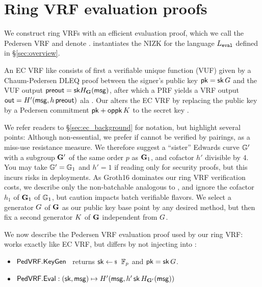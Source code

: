 \section{Ring VRF evaluation proofs} %
\label{sec:pederson_vrf}

We construct ring VRFs with an efficient evaluation proof, which
we call the Pedersen VRF and denote \PedVRF.
\PedVRF instantiates the NIZK for the language $L_{\mathtt{eval}}$ defined in \S\ref{sec:overview}.

An EC VRF like \cite{nsec5,VXEd25519,draft-irtf-cfrg-vrf-10} 
consists of first a verifiable unique function (VUF) given by a
Chaum-Pedersen DLEQ proof between the signer's public key $\mathsf{pk} = \mathsf{sk} \, G$ and
 the VUF output ${\mathsf{preout}} = \mathsf{sk} H_{{\mathbf{G}}}(\mathsf{msg})$,
after which a PRF  yields a VRF output
 ${\mathsf{out}} = H'(\mathsf{msg}, h \, {\mathsf{preout}})$ ala \cite[Proposition 1]{vrf_micali}.
%
Our \PedVRF alters the EC VRF by replacing the public key by
a Pedersen commitment $\mathsf{pk} + \mathsf{oppk} \, K$ to the secret key \sk.%


We refer readers to \S\ref{sec:ec_background} for notation,
 but highlight several points: 
%
Although non-essential, we prefer if \PreOut cannot be verified
by pairings, as a miss-use resistance measure.
We therefore suggest a ``sister'' Edwards curve ${\mathbb{G}}'$ with
 a subgroup ${\mathbf{G}}'$ of the same order $p$ as ${\mathbf{G}}_1$,
 and cofactor $h'$ divisible by 4.
You may take ${\mathbb{G}}' = {\mathbb{G}}_1$ and $h' = 1$ if reading only for
security proofs, but this incurs risks in deployments.
%
As Groth16 dominates our ring VRF verification costs, we describe only
the non-batchable \PedVRF analogous to \cite{nsec5,VXEd25519,draft-irtf-cfrg-vrf-10},
and ignore the cofactor $h_1$ of ${\mathbf{G}}_1$ of ${\mathbb{G}}_1$, 
but caution \cite{HdVBatchEd25519} impacts batch verifiable flavors.
%
We select a generator $G$ of ${\mathbf{G}}$ as our public key base point
 by any desired method, but then
fix a second generator $K$ of ${\mathbf{G}}$ independent from $G$.

We now describe the Pedersen VRF \PedVRF evaluation proof used by our ring VRF:
%
\KeyGen works exactly like EC VRF, but
 \Eval differs by not injecting \pk into \msg:
\begin{itemize}
\item ${\mathsf{PedVRF}}.{\mathsf{KeyGen}}$ \, returns $\sk \leftsample \F_p$ and $\mathsf{pk} = \mathsf{sk} \, G$.
\item ${\mathsf{PedVRF}}.{\mathsf{Eval}} : (\mathsf{sk},\mathsf{msg}) \mapsto H'(\mathsf{msg}, h' \, \mathsf{sk} \, H_{{\mathbf{G}}'}(\mathsf{msg}))$
\end{itemize}

